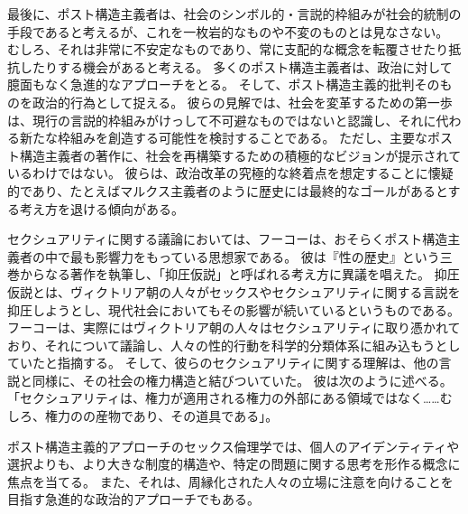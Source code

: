 \documentclass[paper=a4,book,openany]{jlreq}
\begin{document}
最後に、ポスト構造主義者は、社会のシンボル的・言説的枠組みが社会的統制の手段であると考えるが、これを一枚岩的なものや不変のものとは見なさない。
むしろ、それは非常に不安定なものであり、常に支配的な概念を転覆させたり抵抗したりする機会があると考える。
多くのポスト構造主義者は、政治に対して臆面もなく急進的なアプローチをとる。
そして、ポスト構造主義的批判そのものを政治的行為として捉える。
彼らの見解では、社会を変革するための第一歩は、現行の言説的枠組みがけっして不可避なものではないと認識し、それに代わる新たな枠組みを創造する可能性を検討することである。
ただし、主要なポスト構造主義者の著作に、社会を再構築するための積極的なビジョンが提示されているわけではない。
彼らは、政治改革の究極的な終着点を想定することに懐疑的であり、たとえばマルクス主義者のように歴史には最終的なゴールがあるとする考え方を退ける傾向がある。

セクシュアリティに関する議論においては、フーコーは、おそらくポスト構造主義者の中で最も影響力をもっている思想家である。
彼は『性の歴史』という三巻からなる著作を執筆し、「抑圧仮説」と呼ばれる考え方に異議を唱えた。
抑圧仮説とは、ヴィクトリア朝の人々がセックスやセクシュアリティに関する言説を抑圧しようとし、現代社会においてもその影響が続いているというものである。
フーコーは、実際にはヴィクトリア朝の人々はセクシュアリティに取り憑かれており、それについて議論し、人々の性的行動を科学的分類体系に組み込もうとしていたと指摘する。
そして、彼らのセクシュアリティに関する理解は、他の言説と同様に、その社会の権力構造と結びついていた。
彼は次のように述べる。
「セクシュアリティは、権力が適用される権力の外部にある領域ではなく……むしろ、権力のの産物であり、その道具である」\citep[p.152]{foucault81:_histor_sexual}。

ポスト構造主義的アプローチのセックス倫理学では、個人のアイデンティティや選択よりも、より大きな制度的構造や、特定の問題に関する思考を形作る概念に焦点を当てる。
また、それは、周縁化された人々の立場に注意を向けることを目指す急進的な政治的アプローチでもある。
\end{document}

